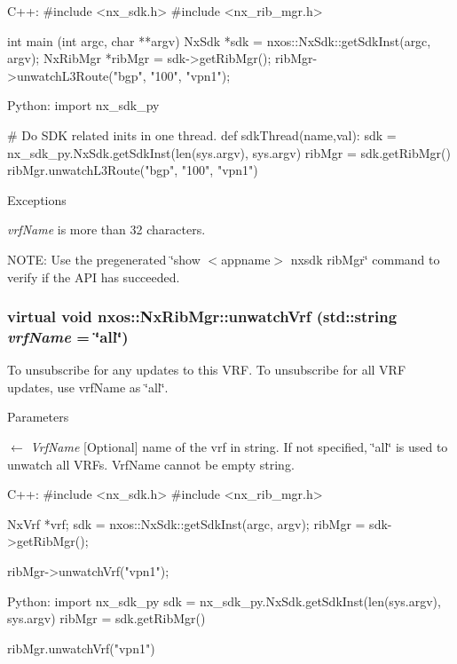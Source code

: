 \begin{DoxyCode}
  C++:
     #include <nx_sdk.h>
     #include <nx_rib_mgr.h>

     int  main (int argc, char **argv)
     {
          NxSdk    *sdk = nxos::NxSdk::getSdkInst(argc, argv);
          NxRibMgr *ribMgr = sdk->getRibMgr();
          ribMgr->unwatchL3Route("bgp", "100", "vpn1");
     }

  Python:
     import nx_sdk_py

     # Do SDK related inits in one thread.
     def sdkThread(name,val):
         sdk = nx_sdk_py.NxSdk.getSdkInst(len(sys.argv), sys.argv)
         ribMgr = sdk.getRibMgr()
         ribMgr.unwatchL3Route("bgp", "100", "vpn1")
\end{DoxyCode}



\begin{DoxyExceptions}{Exceptions}
\item[{\em vrfName}]is more than 32 characters.\end{DoxyExceptions}
NOTE: Use the pregenerated \char`\"{}show $<$appname$>$ nxsdk ribMgr\char`\"{} command to verify if the API has succeeded. \hypertarget{classnxos_1_1NxRibMgr_a957da78022cd4af95ee27941d0b67ce0}{
\subsubsection[{unwatchVrf}]{\setlength{\rightskip}{0pt plus 5cm}virtual void nxos::NxRibMgr::unwatchVrf (std::string {\em vrfName} = {\ttfamily \char`\"{}all\char`\"{}})}}
\label{classnxos_1_1NxRibMgr_a957da78022cd4af95ee27941d0b67ce0}
To unsubscribe for any updates to this VRF. To unsubscribe for all VRF updates, use vrfName as \char`\"{}all\char`\"{}. 
\begin{DoxyParams}{Parameters}
\item[\mbox{$\leftarrow$} {\em VrfName}]\mbox{[}Optional\mbox{]} name of the vrf in string. If not specified, \char`\"{}all\char`\"{} is used to unwatch all VRFs. VrfName cannot be empty string.\end{DoxyParams}

\begin{DoxyCode}
  C++:
       #include <nx_sdk.h>
       #include <nx_rib_mgr.h>

       NxVrf *vrf;
       sdk = nxos::NxSdk::getSdkInst(argc, argv);
       ribMgr = sdk->getRibMgr();

       ribMgr->unwatchVrf("vpn1");

  Python:
       import nx_sdk_py
       sdk = nx_sdk_py.NxSdk.getSdkInst(len(sys.argv), sys.argv)
       ribMgr = sdk.getRibMgr()

       ribMgr.unwatchVrf("vpn1")
\end{DoxyCode}



